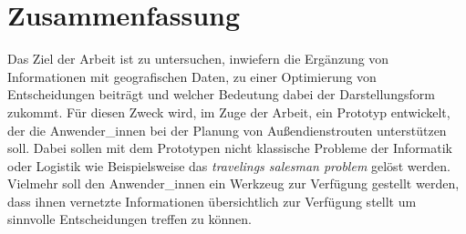 \documentclass[Bachelorarbeit.tex]{subfiles}
\begin{document}
\chapter*{Zusammenfassung}

Das Ziel der Arbeit ist zu untersuchen, 
inwiefern die Ergänzung  von Informationen mit geografischen Daten, 
zu einer Optimierung von Entscheidungen beiträgt und welcher Bedeutung dabei der Darstellungsform zukommt. 
Für diesen Zweck wird, im Zuge der Arbeit, ein Prototyp entwickelt, der die Anwender\_innen bei der Planung von Außendienstrouten unterstützen soll. 
Dabei sollen mit dem Prototypen nicht klassische Probleme der Informatik oder Logistik wie Beispielsweise das \textit{travelings salesman problem} gelöst werden. Vielmehr soll den Anwender\_innen ein Werkzeug zur Verfügung gestellt werden, dass ihnen vernetzte Informationen übersichtlich zur Verfügung stellt um sinnvolle Entscheidungen treffen zu können.\\
\\
\end{document}
